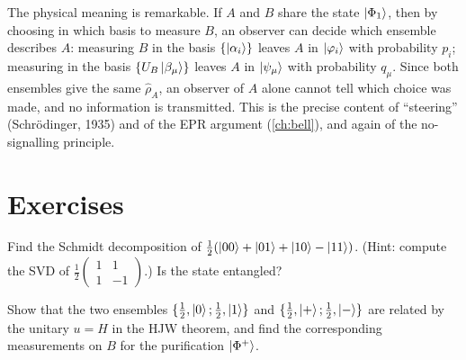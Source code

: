 The physical meaning is remarkable. If $A$ and $B$ share the state $\left|\Phi_1\right\rangle$, then by choosing in which basis to measure $B$, an observer can decide which ensemble describes $A$: measuring $B$ in the basis $\{\left|\alpha_i\right\rangle\}$ leaves $A$ in
$\left|\varphi_i\right\rangle$ with probability $p_i$; measuring in the basis $\{U_B\left|\beta_\mu\right\rangle\}$ leaves $A$ in $\left|\psi_\mu\right\rangle$ with probability $q_\mu$. Since both ensembles give the same $\hat\rho_A$, an observer of $A$ alone cannot tell which choice was made,
and no information is transmitted. This is the precise content of ``steering'' (Schrödinger, 1935) and of the EPR argument (\cref{ch:bell}), and again of the no-signalling principle.

\section{Exercises}
\begin{exercise}
Find the Schmidt decomposition of $\frac12(\left|00\right\rangle+\left|01\right\rangle+\left|10\right\rangle-\left|11\right\rangle)$. (Hint: compute the SVD of $\frac12\begin{pmatrix}1&1\\1&-1\end{pmatrix}$.) Is the state entangled?
\end{exercise}
\begin{exercise}
Show that the two ensembles $\{\frac12,\left|0\right\rangle;\frac12,\left|1\right\rangle\}$ and $\{\frac12,\left|+\right\rangle;\frac12,\left|-\right\rangle\}$ are related by the unitary $u=H$ in the HJW theorem, and find the corresponding measurements on $B$ for the purification $\left|\Phi^+\right\rangle$.
\end{exercise}
